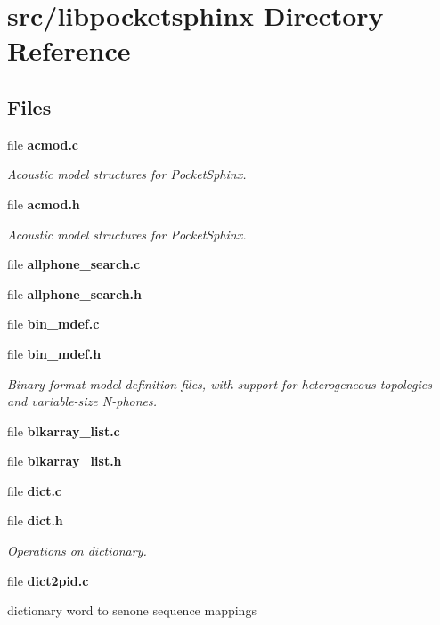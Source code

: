 \section{src/libpocketsphinx Directory Reference}
\label{dir_8d034a1e03e98d9b7ac467250bbebdea}
\subsection*{Files}
\begin{DoxyCompactItemize}
\item 
file {\bf acmod.\+c}
\begin{DoxyCompactList}\small\item\em Acoustic model structures for Pocket\+Sphinx. \end{DoxyCompactList}\item 
file {\bf acmod.\+h}
\begin{DoxyCompactList}\small\item\em Acoustic model structures for Pocket\+Sphinx. \end{DoxyCompactList}\item 
file {\bfseries allphone\+\_\+search.\+c}
\item 
file {\bfseries allphone\+\_\+search.\+h}
\item 
file {\bfseries bin\+\_\+mdef.\+c}
\item 
file {\bf bin\+\_\+mdef.\+h}
\begin{DoxyCompactList}\small\item\em Binary format model definition files, with support for heterogeneous topologies and variable-\/size N-\/phones. \end{DoxyCompactList}\item 
file {\bfseries blkarray\+\_\+list.\+c}
\item 
file {\bfseries blkarray\+\_\+list.\+h}
\item 
file {\bfseries dict.\+c}
\item 
file {\bf dict.\+h}
\begin{DoxyCompactList}\small\item\em Operations on dictionary. \end{DoxyCompactList}\item 
file {\bf dict2pid.\+c}
\begin{DoxyCompactList}\small\item\em 
\begin{DoxyItemize}
\item dictionary word to senone sequence mappings 

\end{DoxyItemize}
\end{DoxyCompactList}
\end{DoxyCompactItemize}
